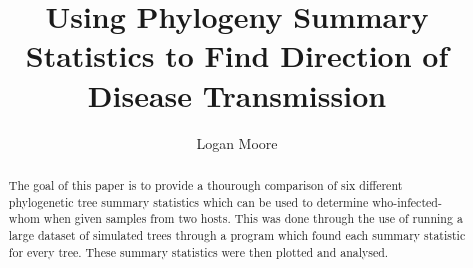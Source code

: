 \documentclass[final,5p,times,twocolumn,authoryear]{elsarticle}
\begin{document}
\begin{frontmatter}



\title{Using Phylogeny Summary Statistics to Find Direction of Disease Transmission}


\author[first]{Logan Moore}

\begin{abstract}
The goal of this paper is to provide a thourough comparison of six different phylogenetic tree summary statistics which can be used to determine who-infected-whom when given samples from two hosts. This was done through the use of running a large dataset of simulated trees through a program which found each summary statistic for every tree. These summary statistics were then plotted and analysed.
\end{abstract}




\end{frontmatter}
\end{document}
